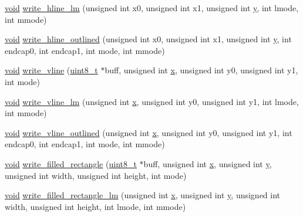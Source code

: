 \begin{DoxyCompactItemize}
\item 
\hyperlink{group___n_a_m_e_ga18028b8badbf1ea7e704ccac3c488e82}{void} \hyperlink{group___o_s_d_g_e_n_module_gacf5cb2507be8b860675b466d19fa4aa8}{write\-\_\-hline\-\_\-lm} (unsigned int x0, unsigned int x1, unsigned int \hyperlink{pios__opahrs__proto_8h_aa4f0d3eebc3c443f9be81bf48561a217}{y}, int lmode, int mmode)
\item 
\hyperlink{group___n_a_m_e_ga18028b8badbf1ea7e704ccac3c488e82}{void} \hyperlink{group___o_s_d_g_e_n_module_ga093e7b26837226a19a69ea698d6db954}{write\-\_\-hline\-\_\-outlined} (unsigned int x0, unsigned int x1, unsigned int \hyperlink{pios__opahrs__proto_8h_aa4f0d3eebc3c443f9be81bf48561a217}{y}, int endcap0, int endcap1, int mode, int mmode)
\item 
\hyperlink{group___n_a_m_e_ga18028b8badbf1ea7e704ccac3c488e82}{void} \hyperlink{group___o_s_d_g_e_n_module_ga34c98ce736d5146c81ef3b167780031f}{write\-\_\-vline} (\hyperlink{stdint_8h_aba7bc1797add20fe3efdf37ced1182c5}{uint8\-\_\-t} $\ast$buff, unsigned int \hyperlink{pios__opahrs__proto_8h_ad0da36b2558901e21e7a30f6c227a45e}{x}, unsigned int y0, unsigned int y1, int mode)
\item 
\hyperlink{group___n_a_m_e_ga18028b8badbf1ea7e704ccac3c488e82}{void} \hyperlink{group___o_s_d_g_e_n_module_ga4ab8daa08074c7ccb69b2f8a1d834979}{write\-\_\-vline\-\_\-lm} (unsigned int \hyperlink{pios__opahrs__proto_8h_ad0da36b2558901e21e7a30f6c227a45e}{x}, unsigned int y0, unsigned int y1, int lmode, int mmode)
\item 
\hyperlink{group___n_a_m_e_ga18028b8badbf1ea7e704ccac3c488e82}{void} \hyperlink{group___o_s_d_g_e_n_module_ga0587de2636d0acd501858f056b6ad4da}{write\-\_\-vline\-\_\-outlined} (unsigned int \hyperlink{pios__opahrs__proto_8h_ad0da36b2558901e21e7a30f6c227a45e}{x}, unsigned int y0, unsigned int y1, int endcap0, int endcap1, int mode, int mmode)
\item 
\hyperlink{group___n_a_m_e_ga18028b8badbf1ea7e704ccac3c488e82}{void} \hyperlink{group___o_s_d_g_e_n_module_ga66c619079158f1694d8cc86f109ba91e}{write\-\_\-filled\-\_\-rectangle} (\hyperlink{stdint_8h_aba7bc1797add20fe3efdf37ced1182c5}{uint8\-\_\-t} $\ast$buff, unsigned int \hyperlink{pios__opahrs__proto_8h_ad0da36b2558901e21e7a30f6c227a45e}{x}, unsigned int \hyperlink{pios__opahrs__proto_8h_aa4f0d3eebc3c443f9be81bf48561a217}{y}, unsigned int width, unsigned int height, int mode)
\item 
\hyperlink{group___n_a_m_e_ga18028b8badbf1ea7e704ccac3c488e82}{void} \hyperlink{group___o_s_d_g_e_n_module_gafdf87d4c22a0fcb603bdfba416768248}{write\-\_\-filled\-\_\-rectangle\-\_\-lm} (unsigned int \hyperlink{pios__opahrs__proto_8h_ad0da36b2558901e21e7a30f6c227a45e}{x}, unsigned int \hyperlink{pios__opahrs__proto_8h_aa4f0d3eebc3c443f9be81bf48561a217}{y}, unsigned int width, unsigned int height, int lmode, int mmode)

\end{DoxyCompactItemize}
